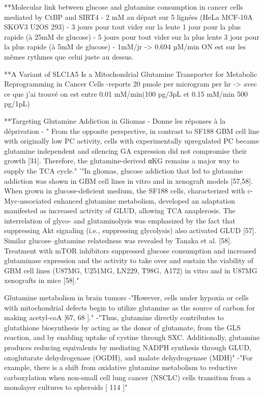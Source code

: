 \documentclass[11pt,a4paper]{article}
\begin{document}
**Molecular link between glucose and glutamine consumption in cancer cells mediated by CtBP and SIRT4
- 2 mM au départ sur 5 lignées (HeLa MCF-10A SKOV3 U2OS 293)
- 3 jours pour tout vider sur la lente 1 jour pour la plus rapide (à 25mM de glucose)
- 5 jours pour tout vider sur la plus lente 3 jour pour la plus rapide (à 5mM de glucose)
- 1mM/jr -> 0.694 µM/min
ON est sur les mêmes rythmes que celui juste au dessus.

**A Variant of SLC1A5 Is a Mitochondrial Glutamine Transporter for Metabolic Reprogramming in Cancer Cells
-reports 20 pmole per microgram per hr ->  avec ce que j'ai trouvé on est entre 0.01 mM/min(100 pg/3pL et 0.15 mM/min 500 pg/1pL)

**Targeting Glutamine Addiction in Gliomas
- Donne les réponses à  la déprivation
- " From the opposite perspective, in contrast to SF188 GBM cell line with originally low PC activity, cells with experimentally upregulated PC became glutamine independent and silencing GA expression did not compromise their growth [31]. Therefore, the glutamine-derived αKG remains a major way to supply the TCA cycle."
'"In gliomas, glucose addiction that led to glutamine addiction was shown in GBM cell lines in vitro and in xenograft models [57,58]. When grown in glucose-deficient medium, the SF188 cells, characterized with c-Myc-associated enhanced glutamine metabolism, developed an adaptation manifested as increased activity of GLUD, allowing TCA anaplerosis. The interrelation of glyco- and glutaminolysis was emphasized by the fact that suppressing Akt signaling (i.e., suppressing glycolysis) also activated GLUD [57]. Similar glucose–glutamine relatedness was revealed by Tanaka et al. [58]. Treatment with mTOR inhibitors suppressed glucose consumption and increased glutaminase expression and the activity to take over and sustain the viability of GBM cell lines (U87MG, U251MG, LN229, T98G, A172) in vitro and in U87MG xenografts in mice [58]."

Glutamine metabolism in brain tumors
-"However, cells under hypoxia or cells with
mitochondrial defects begin to utilize glutamine as the source of carbon for making acetyl-coA [67, 68 ]."
-"Thus, glutamine directly contributes to glutathione biosynthesis by
acting as the donor of glutamate, from the GLS reaction, and by enabling uptake of cystine through
SXC. Additionally, glutamine produces reducing equivalents by mediating NADPH synthesis through
GLUD, oxoglutarate dehydrogenase (OGDH), and malate dehydrogenase (MDH)"
-"For example, there is a shift from oxidative glutamine metabolism to reductive carboxylation when
non-small cell lung cancer (NSCLC) cells transition from a monolayer cultures to spheroids [ 114 ]"
\end{document}
